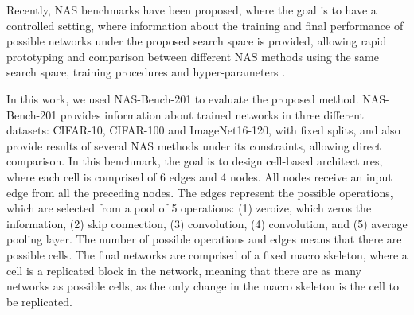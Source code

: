 \documentclass[10pt, conference]{IEEEtran}
\begin{document}
Recently, NAS benchmarks have been proposed, where the goal is to have a controlled setting, where information about the training and final performance of possible networks under the proposed search space is provided, allowing rapid prototyping and comparison between different NAS methods using the same search space, training procedures and hyper-parameters \cite{DBLP:conf/icml/YingKCR0H19, DBLP:conf/iclr/ZelaSH20, DBLP:journals/corr/abs-2008-09777,DBLP:conf/iclr/Dong020}.

In this work, we used NAS-Bench-201 \cite{DBLP:conf/iclr/Dong020} to evaluate the proposed method. NAS-Bench-201 provides information about trained networks in three different datasets: CIFAR-10, CIFAR-100 and ImageNet16-120, with fixed splits, and also provide results of several NAS methods under its constraints, allowing direct comparison. In this benchmark, the goal is to design cell-based architectures, where each cell is comprised of 6 edges and 4 nodes. All nodes receive an input edge from all the preceding nodes. The edges represent the possible operations, which are selected from a pool of 5 operations: (1) zeroize, which zeros the information, (2) skip connection, (3)  convolution, (4)  convolution, and (5)  average pooling layer. The number of possible operations and edges means that there are  possible cells. The final networks are comprised of a fixed macro skeleton, where a cell is a replicated block in the network, meaning that there are as many networks as possible cells, as the only change in the macro skeleton is the cell to be replicated.
\end{document}
